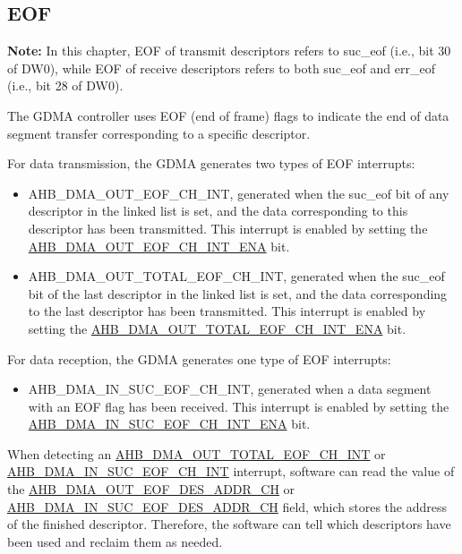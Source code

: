 \documentclass[main\_\_EN.tex]{subfiles}
\begin{document}
\subsection{EOF}

{\bfseries Note: }In this chapter, EOF of transmit descriptors refers to suc\_eof (i.e., bit 30 of DW0), while EOF of receive descriptors refers to both suc\_eof and err\_eof (i.e., bit 28 of DW0).

The GDMA controller uses EOF (end of frame) flags to indicate the end of data segment transfer corresponding to a specific descriptor.

For data transmission, the GDMA generates two types of EOF interrupts:
\begin{itemize}
    \item AHB\_DMA\_OUT\_EOF\_CH\_INT, generated when the suc\_eof bit of any descriptor in the linked list is set, and the data corresponding to this descriptor has been transmitted. This interrupt is enabled by setting the \hyperref[fielddesc:AHBDMAOUTEOFCHNINTENA]{AHB\_DMA\_OUT\_EOF\_CH\_INT\_ENA} bit.
    \item AHB\_DMA\_OUT\_TOTAL\_EOF\_CH\_INT, generated when the suc\_eof bit of the last descriptor in the linked list is set, and the data corresponding to the last descriptor has been transmitted. This interrupt is enabled by setting the \hyperref[fielddesc:AHBDMAOUTTOTALEOFCHNINTENA]{AHB\_DMA\_OUT\_TOTAL\_EOF\_CH\_INT\_ENA} bit.
\end{itemize}

For data reception, the GDMA generates one type of EOF interrupts:
\begin{itemize}
    \item AHB\_DMA\_IN\_SUC\_EOF\_CH\_INT, generated when a data segment with an EOF flag has been received. This interrupt is enabled by setting the \hyperref[fielddesc:AHBDMAINSUCEOFCHNINTENA]{AHB\_DMA\_IN\_SUC\_EOF\_CH\_INT\_ENA} bit.
\end{itemize}

When detecting an \hyperref[int: GDMAOUTTOTALEOFINT]{AHB\_DMA\_OUT\_TOTAL\_EOF\_CH\_INT} or \hyperref[int:GDMAINSUCEOFINT]{AHB\_DMA\_IN\_SUC\_EOF\_CH\_INT} interrupt, software can read the value of the \hyperref[fielddesc:AHBDMAOUTEOFDESADDRCHN]{AHB\_DMA\_OUT\_EOF\_DES\_ADDR\_CH} or \hyperref[fielddesc:AHBDMAINSUCEOFDESADDRCHN]{AHB\_DMA\_IN\_SUC\_EOF\_DES\_ADDR\_CH} field, which stores the address of the finished descriptor. Therefore, the software can tell which descriptors have been used and reclaim them as needed.
\end{document}
